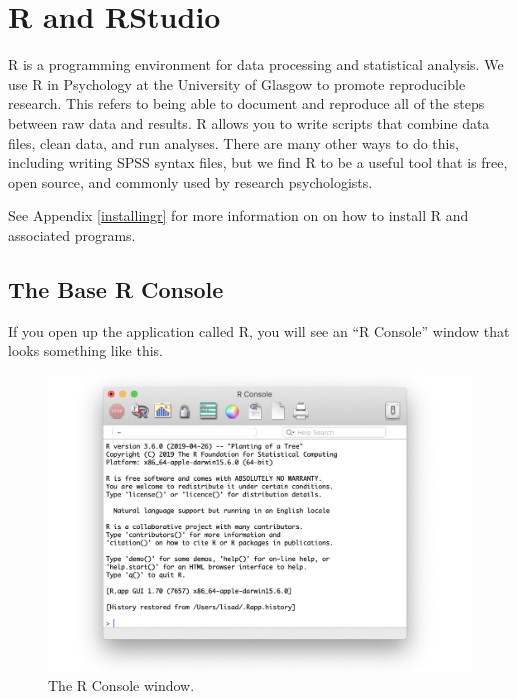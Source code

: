 \documentclass[
  oneside]{book}
\begin{document}
\hypertarget{r-and-rstudio}{%
\section{R and RStudio}\label{r-and-rstudio}}

R is a programming environment for data processing and statistical analysis. We use R in Psychology at the University of Glasgow to promote reproducible research. This refers to being able to document and reproduce all of the steps between raw data and results. R allows you to write scripts that combine data files, clean data, and run analyses. There are many other ways to do this, including writing SPSS syntax files, but we find R to be a useful tool that is free, open source, and commonly used by research psychologists.

\begin{info}
See Appendix \ref{installingr} for more information on on how to install R and associated programs.

\end{info}

\hypertarget{rconsole}{%
\subsection{The Base R Console}\label{rconsole}}

If you open up the application called R, you will see an ``R Console'' window that looks something like this.

\begin{figure}

{\centering \includegraphics[width=1\linewidth]{images/intro/r_console} 

}

\caption{The R Console window.}\label{fig:img-repl}
\end{figure}
\end{document}
